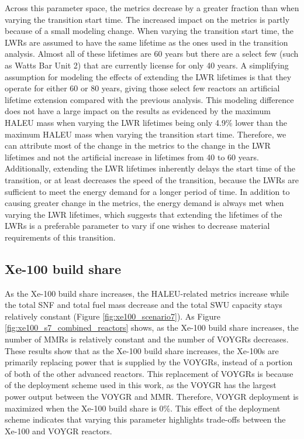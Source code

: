 Across this parameter space, the metrics decrease by a greater fraction than 
when varying the transition start time. The increased impact on the metrics 
is partly because of a small modeling change. When varying the transition 
start time, the \glspl{LWR} are assumed to have the same lifetime as the 
ones used in the transition analysis. Almost all of these lifetimes are  
60 years but there are a select few (such as Watts Bar Unit 2) that 
are currently license for only 40 years. A simplifying assumption for 
modeling the effects of extending the \gls{LWR} lifetimes is that 
they operate for either 60 or 80 years, giving those select few reactors 
an artificial lifetime extension compared with the previous analysis. 
This modeling difference does not have a large impact on the results as 
evidenced by the maximum \gls{HALEU} mass when varying the \gls{LWR} lifetimes 
being only 4.9\% lower than the maximum \gls{HALEU} mass when varying the 
transition start time. Therefore, we can attribute most of the change in
the metrics to the 
change in the \gls{LWR} lifetimes and not the artificial increase in 
lifetimes from 40 to 60 years. Additionally, extending the \gls{LWR}
lifetimes inherently delays the start time of the transition, or at 
least decreases the speed of the transition, because the \glspl{LWR} 
are sufficient to meet the energy demand for a longer period of time.
In addition to causing greater change in the metrics, the energy demand 
is always met when varying the \gls{LWR} lifetimes, which suggests that 
extending the lifetimes of the \glspl{LWR} is a preferable parameter to vary 
if one wishes to decrease material requirements of this transition. 

\subsection{Xe-100 build share}
As the Xe-100 build share increases, the \gls{HALEU}-related metrics 
increase while the total \gls{SNF} and total fuel mass decrease and the 
total \gls{SWU} capacity stays relatively constant 
(Figure \ref{fig:xe100_scenario7}). As Figure \ref{fig:xe100_s7_combined_reactors} 
shows, as the Xe-100 build share 
increases, the number of \glspl{MMR} is relatively constant and the number of 
VOYGRs decreases. These results show that as the Xe-100 build share 
increases, the Xe-100s are primarily replacing power that is supplied by 
the VOYGRs, instead of a portion of both of the other advanced reactors.
This replacement of VOYGRs is because of the deployment scheme used in this
work, as the VOYGR has the largest power output between the VOYGR and 
\gls{MMR}. Therefore, VOYGR deployment is maximized when the Xe-100 
build share is 0\%. This effect of the deployment scheme indicates that 
varying this parameter highlights trade-offs between the Xe-100 and 
VOYGR reactors.

